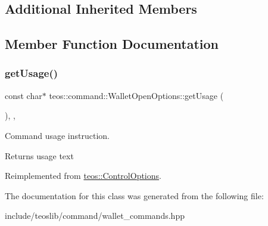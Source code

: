 \subsection*{Additional Inherited Members}


\subsection{Member Function Documentation}
\mbox{\label{classteos_1_1command_1_1_wallet_open_options_aedf25a6f772392c2cb0c0de8d80172dd}} 
\subsubsection{\texorpdfstring{get\+Usage()}{getUsage()}}
{\footnotesize\ttfamily const char$\ast$ teos\+::command\+::\+Wallet\+Open\+Options\+::get\+Usage (\begin{DoxyParamCaption}{ }\end{DoxyParamCaption})\hspace{0.3cm}{\ttfamily [inline]}, {\ttfamily [protected]}, {\ttfamily [virtual]}}



Command \textquotesingle{}usage\textquotesingle{} instruction. 

\begin{DoxyReturn}{Returns}
usage text 
\end{DoxyReturn}


Reimplemented from \mbox{\hyperlink{classteos_1_1_control_options_a0aa5671f9bc750ed5280c26c543874f3}{teos\+::\+Control\+Options}}.



The documentation for this class was generated from the following file\+:\begin{DoxyCompactItemize}
\item 
include/teoslib/command/wallet\+\_\+commands.\+hpp\end{DoxyCompactItemize}
